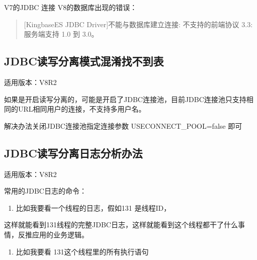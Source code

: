 \documentclass[a4,10pt,oneside,english]{sphinxmanual}
\begin{document}
V7的JDBC 连接 V8的数据库出现的错误：
\begin{quote}

{[}KingbaseES JDBC Driver{]}不能与数据库建立连接: 不支持的前端协议 3.3: 服务端支持 1.0 到 3.0。
\end{quote}


\subsection{JDBC读写分离模式混淆找不到表}
\label{\detokenize{interface/jdbc:id12}}
适用版本：V8R2

如果是开启读写分离的，可能是开启了JDBC连接池，目前JDBC连接池只支持相同的URL相同用户的连接，不支持多用户名。

解决办法关闭JDBC连接池指定连接参数 USECONNECT\_POOL=false 即可


\subsection{JDBC读写分离日志分析办法}
\label{\detokenize{interface/jdbc:id13}}
适用版本：V8R2

常用的JDBC日志的命令：
\begin{enumerate}
%
\item {} 
比如我要看一个线程的日志，假如131 是线程ID，

\end{enumerate}

\begin{sphinxVerbatim}[commandchars=\\\{\}]
 \PYG{l+s+s2}{[131}\PYG{l+s+s2}{]}   
\end{sphinxVerbatim}

这样就能看到131线程的完整JDBC日志，这样就能看到这个线程都干了什么事情，反推应用的业务逻辑。
\begin{enumerate}
%
\setcounter{enumi}{1}
\item {} 
比如我要看 131这个线程里的所有执行语句

\end{enumerate}

\begin{sphinxVerbatim}[commandchars=\\\{\}]
    
\end{sphinxVerbatim}
\end{document}
